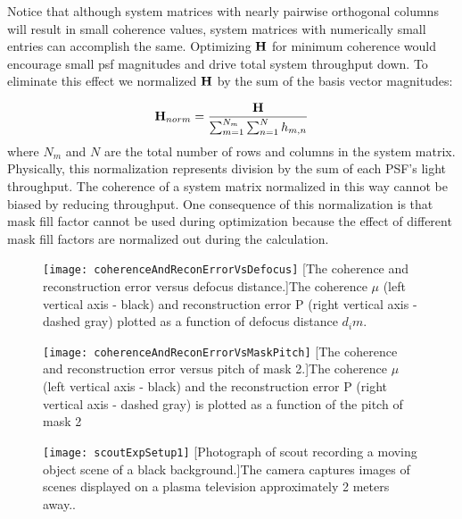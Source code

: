 Notice that although system matrices with nearly pairwise orthogonal columns will result in small coherence values, system matrices with numerically small entries can accomplish the same. Optimizing $\mathbf{H}$ for minimum coherence would encourage small \gls{psf} magnitudes and drive total system throughput down. To eliminate this effect we normalized $\mathbf{H}$ by the sum of the basis vector magnitudes:

\begin{equation}
	\mathbf{H}_{norm} = \frac{ \mathbf{H} }{ \sum_{m = 1}^{N_m} \sum_{n = 1}^{N} h_{m,n} }
\end{equation}
%
where $N_m$ and $N$ are the total number of rows and columns in the system matrix. Physically, this normalization represents division by the sum of each PSF’s light throughput. The coherence of a system matrix normalized in this way cannot be biased by reducing throughput. One consequence of this normalization is that mask fill factor cannot be used during optimization because the effect of different mask fill factors are normalized out during the calculation.

\begin{figure}[!ht]
	\texttt{[image: coherenceAndReconErrorVsDefocus]}
	[The coherence and reconstruction error versus defocus distance.]{The coherence $\mu$ (left vertical axis - black) and reconstruction error P (right vertical axis - dashed gray) plotted as a function of defocus distance $d_im$. }
	\label{fig:coherenceAndReconErrorVsDefocus}
\end{figure}

\begin{figure}[!ht]
	\texttt{[image: coherenceAndReconErrorVsMaskPitch]}
	[The coherence and reconstruction error versus pitch of mask 2.]{The coherence $\mu$ (left vertical axis - black) and the reconstruction error P (right vertical axis - dashed gray) is plotted as a function of the pitch of mask 2 }
	\label{fig:coherenceAndReconErrorVsMaskPitch}
\end{figure}


\begin{figure}[!ht]
	\centering
	\texttt{[image: scoutExpSetup1]}
	[Photograph of \gls{scout} recording a moving object scene of a black background.]{The camera captures images of scenes displayed on a plasma television approximately 2 meters away..}
	\label{fig:scoutExpSetup1}
\end{figure}

